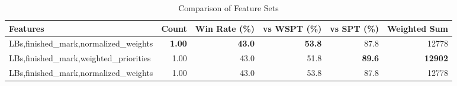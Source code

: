\begin{table}[htbp]%
\centering%
\begin{tabular}{lrrrrr}%
\toprule%
\textbf{Features}&\textbf{Count}&\textbf{Win Rate (\%)}&\textbf{vs WSPT (\%)}&\textbf{vs SPT (\%)}&\textbf{Weighted Sum}\\%
\midrule%
LBs,finished_mark,normalized_weights&\textbf{1.00}&\textbf{43.0}&\textbf{53.8}&87.8&12778\\%
LBs,finished_mark,weighted_priorities&1.00&43.0&51.8&\textbf{89.6}&\textbf{12902}\\%
LBs,finished_mark,normalized_weights&1.00&43.0&53.8&87.8&12778\\%
\bottomrule%
\end{tabular}%
\caption{Comparison of Feature Sets}%
\label{tab:features}%
\end{table}